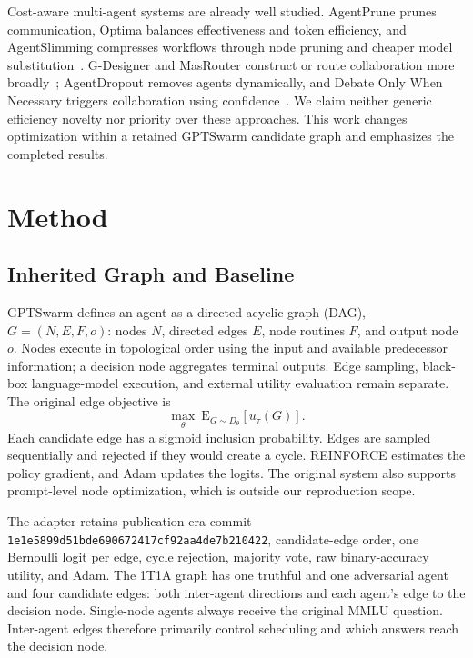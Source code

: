 \documentclass[journal]{IEEEtran}
\begin{document}
Cost-aware multi-agent systems are already well studied. AgentPrune prunes communication, Optima balances effectiveness and token efficiency, and AgentSlimming compresses workflows through node pruning and cheaper model substitution~\cite{zhang2024agentprune,chen2024optima,chen2026agentslimming}. G-Designer and MasRouter construct or route collaboration more broadly~\cite{zhang2024gdesigner,yue2025masrouter}; AgentDropout removes agents dynamically, and Debate Only When Necessary triggers collaboration using confidence~\cite{wang2025agentdropout,eo2025debate}. We claim neither generic efficiency novelty nor priority over these approaches. This work changes optimization within a retained GPTSwarm candidate graph and emphasizes the completed results.

\section{Method}
\subsection{Inherited Graph and Baseline}
GPTSwarm defines an agent as a directed acyclic graph (DAG), $G=(N,E,F,o)$: nodes $N$, directed edges $E$, node routines $F$, and output node $o$. Nodes execute in topological order using the input and available predecessor information; a decision node aggregates terminal outputs. Edge sampling, black-box language-model execution, and external utility evaluation remain separate. The original edge objective is
\begin{equation}
 \max_\theta\ \mathrm{E}_{G\sim D_\theta}[u_\tau(G)].
\end{equation}
Each candidate edge has a sigmoid inclusion probability. Edges are sampled sequentially and rejected if they would create a cycle. REINFORCE estimates the policy gradient, and Adam updates the logits. The original system also supports prompt-level node optimization, which is outside our reproduction scope.

The adapter retains publication-era commit \texttt{1e1e5899d51bde690672417cf92aa4de7b210422}, candidate-edge order, one Bernoulli logit per edge, cycle rejection, majority vote, raw binary-accuracy utility, and Adam. The 1T1A graph has one truthful and one adversarial agent and four candidate edges: both inter-agent directions and each agent's edge to the decision node. Single-node agents always receive the original MMLU question. Inter-agent edges therefore primarily control scheduling and which answers reach the decision node.
\end{document}
